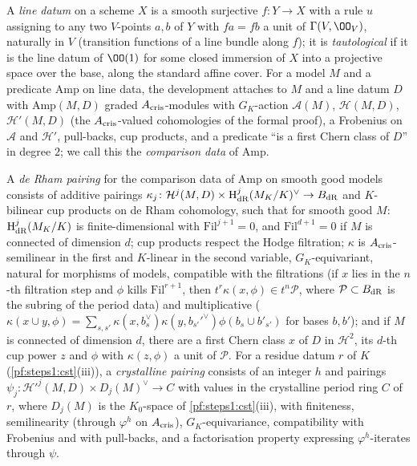 \begin{definition}\label{pf:steps1:def:linedata}
A \emph{line datum} on a scheme $X$ is a smooth surjective $f\colon Y\to X$ with a rule $u$ assigning to any two
$V$-points $a,b$ of $Y$ with $fa=fb$ a unit of $\Gamma(V,\OO_V)$, naturally in $V$ (transition functions of a line bundle
along $f$); it is \emph{tautological} if it is the line datum of $\OO(1)$ for some closed immersion of $X$ into a
projective space over the base, along the standard affine cover. For a model $M$ and a predicate $\mathrm{Amp}$ on line
data, the development attaches to $M$ and a line datum $D$ with $\mathrm{Amp}(M,D)$ graded $A_{\mathrm{cris}}$-modules with
$G_K$-action $\mathcal A(M)$, $\mathcal H(M,D)$, $\mathcal H'(M,D)$ (the $A_{\mathrm{cris}}$-valued cohomologies of the formal
proof), a Frobenius on $\mathcal A$ and $\mathcal H'$, pull-backs, cup products, and a predicate ``is a first Chern class
of $D$'' in degree $2$; we call this the \emph{comparison data} of $\mathrm{Amp}$.
 
\end{definition}

\begin{definition}\label{pf:steps1:def:pmap}
A \emph{de Rham pairing} for the comparison data of $\mathrm{Amp}$ on smooth good models consists of additive pairings
$\kappa_j\colon\mathcal H^j(M,D)\times\mathrm{H}^j_{\mathrm{dR}}(M_K/K)^\vee\to B_{\mathrm{dR}}$ and $K$-bilinear cup products on de
Rham cohomology, such that for smooth good $M$: $\mathrm{H}^j_{\mathrm{dR}}(M_K/K)$ is finite-dimensional with
$\mathrm{Fil}^{j+1}=0$, and $\mathrm{Fil}^{d+1}=0$ if $M$ is connected of dimension $d$; cup products respect the Hodge
filtration; $\kappa$ is $A_{\mathrm{cris}}$-semilinear in the first and $K$-linear in the second variable, $G_K$-equivariant,
natural for morphisms of models, compatible with the filtrations (if $x$ lies in the $n$-th filtration step and $\phi$
kills $\mathrm{Fil}^{r+1}$, then $t^r\kappa(x,\phi)\in t^n\mathcal P$, where $\mathcal P\subset B_{\mathrm{dR}}$ is the subring of
the period data) and multiplicative ($\kappa(x\cup y,\phi)=\sum_{s,s'}\kappa(x,b_s^\vee)\kappa(y,b_{s'}'^\vee)
\phi(b_s\cup b'_{s'})$ for bases $b,b'$); and if $M$ is connected of dimension $d$, there are a first Chern class $x$
of $D$ in $\mathcal H^2$, its $d$-th cup power $z$ and $\phi$ with $\kappa(z,\phi)$ a unit of $\mathcal P$. For a
residue datum $r$ of $K$ (\cref{pf:steps1:cst}(iii)), a \emph{crystalline pairing} consists of an integer $h$ and pairings
$\psi_j\colon\mathcal H'^j(M,D)\times D_j(M)^\vee\to C$ with values in the crystalline period ring $C$ of $r$, where
$D_j(M)$ is the $K_0$-space of \cref{pf:steps1:cst}(iii), with finiteness, semilinearity
(through $\varphi^h$ on $A_{\mathrm{cris}}$), $G_K$-equivariance, compatibility with Frobenius and with pull-backs, and a
factorisation property expressing $\varphi^h$-iterates through $\psi$.
 
\end{definition}

